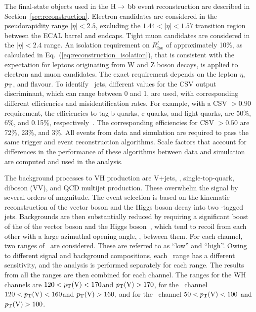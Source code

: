 \documentclass[11pt,twoside,a4paper,cmspaper,final,collab]{cms-tdr}
\begin{document}
The final-state objects used in the $\mathrm{H} \to \,\mathrm{b} \mathrm{b}$  event reconstruction
are described in Section~\ref{sec:reconstruction}. Electron candidates are
considered in the pseudorapidity range $\left | \eta \right | < 2.5$,
excluding the  $1.44 <\left | \eta \right | < 1.57$ transition
region between the ECAL barrel and endcaps. Tight muon candidates are
considered in the  $\left | \eta \right | < 2.4$ range.
An isolation requirement on $R_\text{Iso}^{\ell}$ of approximately 10\%, as calculated in
Eq.~(\ref{eq:reconstruction_isolation}), that is consistent
with the expectation for leptons originating from W and Z boson decays,
is applied to electron and muon candidates. The exact requirement depends on the lepton $\eta$, $p_{\mathrm{T}}$,
and flavour. To identify \cPqb\ jets, different values for the CSV output discriminant, which can
range between 0 and 1, are used, with
corresponding different efficiencies and misidentification rates.  For example, with
a CSV $>0.90$ requirement, the efficiencies to tag
b quarks, c quarks, and light quarks, are 50\%,
6\%, and 0.15\%, respectively~\cite{CMS-PAS-BTV-12-001}. The corresponding efficiencies for
CSV $>0.50$ are 72\%, 23\%, and 3\%. All events from data and simulation are required to
pass the same trigger and event reconstruction algorithms. Scale
factors that account for differences in the performance of these
algorithms between data and simulation are computed and used in
the analysis.




The background processes to VH production are V+jets, \ttbar,
single-top-quark, diboson (VV),
and QCD multijet production. These overwhelm the signal by several orders of
magnitude. The event selection is based on the kinematic
reconstruction of the vector boson and the Higgs boson decay
into two \cPqb-tagged jets. Backgrounds are then substantially reduced by
requiring a significant boost of the \pt of the vector boson and the
Higgs boson~\cite{PhysRevLett.100.242001}, which tend
to recoil from each other with a large azimuthal opening angle,  \dphiVH,
between them.  For each channel, two ranges
  of \ptV\ are considered. These are
        referred to as ``low'' and ``high''.
        Owing to different signal and background
        compositions, each \ptV\ range  has a different sensitivity, and
        the analysis is performed separately for each range. The
        results from all the ranges are then combined for each channel. The ranges
        for the WH channels are $120<p_{\mathrm{T}}(\mathrm{V})<170$\GeV and $p_{\mathrm{T}}(\mathrm{V})>170$\GeV,
        for the \ZnnH\ channel $120<p_{\mathrm{T}}(\mathrm{V})<160$\GeV and
        $p_{\mathrm{T}}(\mathrm{V})>160$\GeV, and for the \ZllH\ channel $50<p_{\mathrm{T}}(\mathrm{V})<100$\GeV
        and $p_{\mathrm{T}}(\mathrm{V})>100$\GeV.
\end{document}
